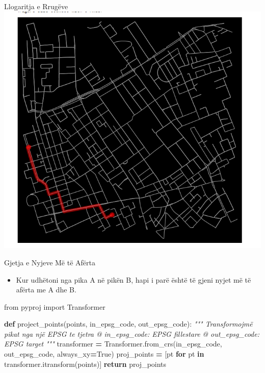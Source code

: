 \documentclass[
  ignorenonframetext,
]{beamer}
\newenvironment{Shaded}{\begin{snugshade}}{\end{snugshade}}
\newcommand{\CommentTok}[1]{\textcolor[rgb]{0.56,0.35,0.01}{\textit{#1}}}
\newcommand{\ControlFlowTok}[1]{\textcolor[rgb]{0.13,0.29,0.53}{\textbf{#1}}}
\newcommand{\ImportTok}[1]{#1}
\newcommand{\KeywordTok}[1]{\textcolor[rgb]{0.13,0.29,0.53}{\textbf{#1}}}
\newcommand{\NormalTok}[1]{#1}
\newcommand{\OperatorTok}[1]{\textcolor[rgb]{0.81,0.36,0.00}{\textbf{#1}}}
\newcommand{\VariableTok}[1]{\textcolor[rgb]{0.00,0.00,0.00}{#1}}
\providecommand{\tightlist}{%
  \setlength{\itemsep}{0pt}\setlength{\parskip}{0pt}}
\begin{document}
\begin{frame}{Llogaritja e Rrugëve}
\protect\hypertarget{llogaritja-e-rruguxebve-1}{}
\includegraphics{./Figs/rrugshkurter.png}
\end{frame}

\begin{frame}[fragile]{Gjetja e Nyjeve Më të Afërta}
\protect\hypertarget{gjetja-e-nyjeve-muxeb-tuxeb-afuxebrta}{}
\begin{itemize}
\tightlist
\item
  Kur udhëtoni nga pika A në pikën B, hapi i parë është të gjeni nyjet
  më të afërta me A dhe B.
\end{itemize}


\begin{Shaded}
\begin{Highlighting}[]
\ImportTok{from}\NormalTok{ pyproj }\ImportTok{import}\NormalTok{ Transformer}

\KeywordTok{def}\NormalTok{ project\_points(points, in\_epsg\_code, out\_epsg\_code):}
    \CommentTok{""" Transformojmë pikat nga një EPSG te tjetra}
\CommentTok{    @ in\_epsg\_code: EPSG fillestare}
\CommentTok{    @ out\_epsg\_code: EPSG target}
\CommentTok{    """}
\NormalTok{    transformer }\OperatorTok{=}\NormalTok{ Transformer.from\_crs(in\_epsg\_code, out\_epsg\_code, always\_xy}\OperatorTok{=}\VariableTok{True}\NormalTok{)}
\NormalTok{    proj\_points }\OperatorTok{=}\NormalTok{ [pt }\ControlFlowTok{for}\NormalTok{ pt }\KeywordTok{in}\NormalTok{ transformer.itransform(points)]}
    \ControlFlowTok{return}\NormalTok{ proj\_points}
\end{Highlighting}
\end{Shaded}
\end{frame}
\end{document}

